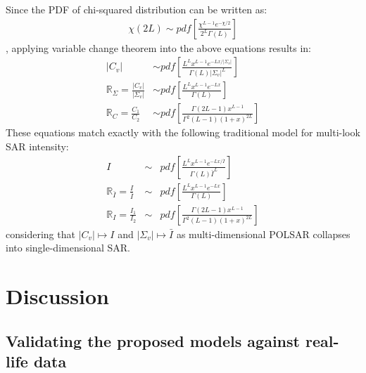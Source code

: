 \documentclass[journal]{IEEEtran}
\begin{document}
Since the PDF of chi-squared distribution can be written as:
\begin{align*}
\chi(2L) \sim pdf \left[ \frac{\chi^{L-1}e^{-\chi/2}}{2^L\Gamma(L)} \right]
\end{align*}
, applying variable change theorem into the above equations results in:
\begin{align*}
  |C_v| &\sim  pdf \left[ \frac{L^L x^{L-1} e^{-Lx/|\Sigma_v|}}{\Gamma(L) |\Sigma_v|^L} \right] \\ %
  \mathbb{R}_{\Sigma} = \frac{|C_v|}{|\Sigma_v|} &\sim pdf \left[ \frac{ L^{L} x^{L-1} e^{-Lx}}{ \Gamma(L)} \right] \\ %
  \mathbb{R}_{C} = \frac{C_1}{C_2} &\sim pdf \left[ \frac{\Gamma(2L-1) x^{L-1}}{\Gamma^2(L-1) (1+x)^{2L}} \right]
\end{align*}
These equations match exactly with the following traditional model for multi-look SAR intensity:
  \begin{eqnarray}
I &\sim& pdf \left[ \frac{L^L x^{L-1} e^{-Lx/\bar{I}}}{\Gamma(L) \bar{I}^L} \right] \\
\mathbb{R}_{\bar{I}} = \frac{I}{\bar{I}} &\sim& pdf \left[ \frac{ L^{L} x^{L-1} e^{-Lx}}{ \Gamma(L)} \label{eqn:multi_look_SAR_ratio_dist} \right] \\
  \mathbb{R}_{I} = \frac{I_1}{I_2} &\sim& pdf \left[ \frac{\Gamma(2L-1) x^{L-1}}{\Gamma^2(L-1) (1+x)^{2L}} \right]
  \end{eqnarray}
considering that $|C_v| \mapsto I$ and $|\Sigma_v| \mapsto \bar{I}$ as multi-dimensional POLSAR collapses into single-dimensional SAR.

\section{Discussion}

\subsection{Validating the proposed models against real-life data}
\label{sec:polsar_models_validation}
\end{document}

